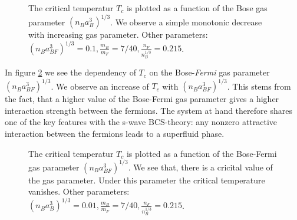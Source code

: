 \begin{figure} 
\begin{center}  
  
\caption{The critical temperatur $T_c$ is plotted as a function of the Bose gas parameter $(n_Ba_B^3)^{1/3}$. We observe a simple monotonic decrease with increasing gas parameter. Other parameters: $(n_Ba_{BF}^3)^{1/3} = 0.1, \frac{m_B}{m_F} = 7/40, \frac{n_F}{n_B^{1/3}} = 0.215$. }  
\label{fig.TCrB}  
\end{center}    
\end{figure}

In figure \ref{fig.TCrBF} we see the dependency of $T_c$ on the Bose-\textit{Fermi} gas parameter $(n_Ba_{BF}^3)^{1/3}$. We observe an increase of $T_c$ with $(n_Ba_{BF}^3)^{1/3}$. This stems from the fact, that a higher value of the Bose-Fermi gas parameter gives a higher interaction strength between the fermions. The system at hand therefore shares one of the key features with the s-wave BCS-theory: any nonzero attractive interaction between the fermions leads to a superfluid phase. 

\begin{figure} 
\begin{center}  
  
\caption{The critical temperatur $T_c$ is plotted as a function of the Bose-Fermi gas parameter $(n_Ba_{BF}^3)^{1/3}$. We see that, there is a cricital value of the gas parameter. Under this parameter the critical temperature vanishes. Other parameters: $(n_Ba_{B}^3)^{1/3} = 0.01, \frac{m_B}{m_F} = 7/40, \frac{n_F}{n_B^{1/3}} = 0.215$. }  
\label{fig.TCrBF}  
\end{center}    
\end{figure}



